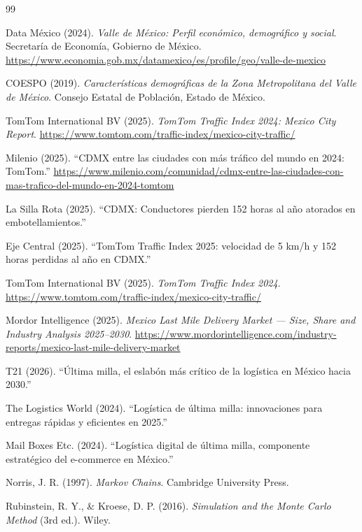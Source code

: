 \documentclass[11pt,a4paper]{article}
\begin{document}
\begin{thebibliography}{99}

Data México (2024). \textit{Valle de México: Perfil económico, demográfico y social}. Secretaría de Economía, Gobierno de México. \url{https://www.economia.gob.mx/datamexico/es/profile/geo/valle-de-mexico}

COESPO (2019). \textit{Características demográficas de la Zona Metropolitana del Valle de México}. Consejo Estatal de Población, Estado de México.

TomTom International BV (2025). \textit{TomTom Traffic Index 2024: Mexico City Report}. \url{https://www.tomtom.com/traffic-index/mexico-city-traffic/}

Milenio (2025). ``CDMX entre las ciudades con más tráfico del mundo en 2024: TomTom.'' \url{https://www.milenio.com/comunidad/cdmx-entre-las-ciudades-con-mas-trafico-del-mundo-en-2024-tomtom}

La Silla Rota (2025). ``CDMX: Conductores pierden 152 horas al año atorados en embotellamientos.''

Eje Central (2025). ``TomTom Traffic Index 2025: velocidad de 5 km/h y 152 horas perdidas al año en CDMX.''

 TomTom International BV (2025). \textit{TomTom Traffic Index 2024}. \url{https://www.tomtom.com/traffic-index/mexico-city-traffic/}

Mordor Intelligence (2025). \textit{Mexico Last Mile Delivery Market — Size, Share and Industry Analysis 2025--2030}. \url{https://www.mordorintelligence.com/industry-reports/mexico-last-mile-delivery-market}

T21 (2026). ``Última milla, el eslabón más crítico de la logística en México hacia 2030.''

The Logistics World (2024). ``Logística de última milla: innovaciones para entregas rápidas y eficientes en 2025.''

Mail Boxes Etc. (2024). ``Logística digital de última milla, componente estratégico del e-commerce en México.''

Norris, J. R. (1997). \textit{Markov Chains}. Cambridge University Press.

Rubinstein, R. Y., \& Kroese, D. P. (2016). \textit{Simulation and the Monte Carlo Method} (3rd ed.). Wiley.


\end{thebibliography}
\end{document}
